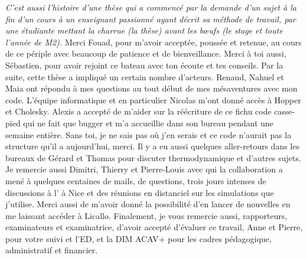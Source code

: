 {\it C'est aussi l'histoire d'une thèse qui a commencé par la demande d'un sujet à la fin d'un cours à un enseignant passionné ayant décrit sa méthode de travail, par une étudiante mettant la charrue (la thèse) avant les bœufs (le stage et toute l'année de M2).} Merci Fouad, pour m'avoir acceptée, poussée et retenue, au cours de ce périple avec beaucoup de patience et de bienveillance. Merci à toi aussi, Sébastien, pour avoir rejoint ce bateau avec ton écoute et tes conseils. Par la suite, cette thèse a impliqué un certain nombre d'acteurs. Renaud, Nahuel et Maia ont répondu à mes questions au tout début de mes mésaventures avec mon code. L'équipe informatique et en particulier Nicolas m'ont donné accès à Hopper et Cholesky. Alexis a accepté de m'aider sur la réécriture de ce \og fichu code casse-pied qui ne fait que bugger\fg{} et m'a accueillie dans son bureau pendant une semaine entière. Sans toi, je ne sais pas où j'en serais et ce code n'aurait pas la structure qu'il a aujourd'hui, merci. Il y a eu aussi quelques aller-retours dans les bureaux de Gérard et Thomas pour discuter thermodynamique et d'autres sujets. Je remercie aussi Dimitri, Thierry et Pierre-Louis avec qui la collaboration a mené à quelques centaines de mails, de questions, trois jours intenses de discussions à l' à Nice et des réunions en distanciel sur les simulations que j'utilise. Merci aussi de m'avoir donné la possibilité d'en lancer de nouvelles en me laissant accéder à Licallo. Finalement, je vous remercie aussi, rapporteurs, examinateurs et examinatrice, d'avoir accepté d'évaluer ce travail, Anne et Pierre, pour votre suivi et l'ED,  et la DIM ACAV+ pour les cadres pédagogique, administratif et financier.  

